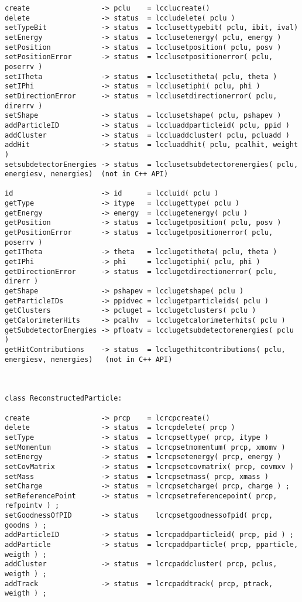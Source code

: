 \begin{scriptsize}
\begin{verbatim}
create                 -> pclu    = lcclucreate()
delete                 -> status  = lccludelete( pclu )
setTypeBit             -> status  = lcclusettypebit( pclu, ibit, ival)
setEnergy              -> status  = lcclusetenergy( pclu, energy )
setPosition            -> status  = lcclusetposition( pclu, posv )
setPositionError       -> status  = lcclusetpositionerror( pclu, poserrv )
setITheta              -> status  = lcclusetitheta( pclu, theta )
setIPhi                -> status  = lcclusetiphi( pclu, phi )
setDirectionError      -> status  = lcclusetdirectionerror( pclu, direrrv )
setShape               -> status  = lcclusetshape( pclu, pshapev )
addParticleID          -> status  = lccluaddparticleid( pclu, ppid )
addCluster             -> status  = lccluaddcluster( pclu, pcluadd )
addHit                 -> status  = lccluaddhit( pclu, pcalhit, weight )
setsubdetectorEnergies -> status  = lcclusetsubdetectorenergies( pclu, energiesv, nenergies)  (not in C++ API)

id                     -> id      = lccluid( pclu )
getType                -> itype   = lcclugettype( pclu )
getEnergy              -> energy  = lcclugetenergy( pclu )
getPosition            -> status  = lcclugetposition( pclu, posv )
getPositionError       -> status  = lcclugetpositionerror( pclu, poserrv )
getITheta              -> theta   = lcclugetitheta( pclu, theta )
getIPhi                -> phi     = lcclugetiphi( pclu, phi )
getDirectionError      -> status  = lcclugetdirectionerror( pclu, direrr )
getShape               -> pshapev = lcclugetshape( pclu )
getParticleIDs         -> ppidvec = lcclugetparticleids( pclu )
getClusters            -> pcluget = lcclugetclusters( pclu )
getCalorimeterHits     -> pcalhv  = lcclugetcalorimeterhits( pclu )
getSubdetectorEnergies -> pfloatv = lcclugetsubdetectorenergies( pclu )
getHitContributions    -> status  = lcclugethitcontributions( pclu, energiesv, nenergies)   (not in C++ API)



class ReconstructedParticle:

create                 -> prcp    = lcrcpcreate()
delete                 -> status  = lcrcpdelete( prcp )
setType                -> status  = lcrcpsettype( prcp, itype )
setMomentum            -> status  = lcrcpsetmomentum( prcp, xmomv )
setEnergy              -> status  = lcrcpsetenergy( prcp, energy )
setCovMatrix           -> status  = lcrcpsetcovmatrix( prcp, covmxv )
setMass                -> status  = lcrcpsetmass( prcp, xmass )
setCharge              -> status  = lcrcpsetcharge( prcp, charge ) ;
setReferencePoint      -> status  = lcrcpsetreferencepoint( prcp, refpointv ) ;
setGoodnessOfPID       -> status    lcrcpsetgoodnessofpid( prcp, goodns ) ;
addParticleID          -> status  = lcrcpaddparticleid( prcp, pid ) ;
addParticle            -> status  = lcrcpaddparticle( prcp, pparticle, weigth ) ;
addCluster             -> status  = lcrcpaddcluster( prcp, pclus, weigth ) ;
addTrack               -> status  = lcrcpaddtrack( prcp, ptrack, weigth ) ;


\end{verbatim}
\end{scriptsize}
